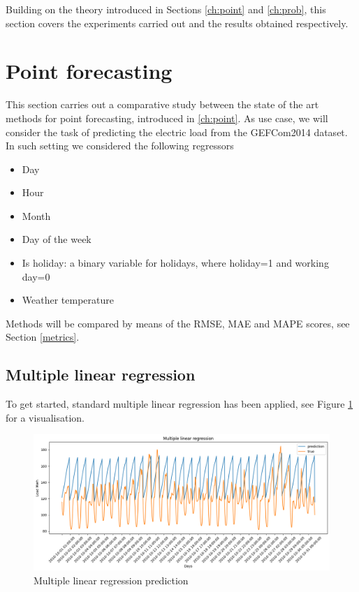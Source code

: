 Building on the theory introduced in Sections \ref{ch:point} and \ref{ch:prob}, this section covers the experiments carried out and the results obtained respectively.


\section{Point forecasting}
This section carries out a comparative study between the state of the art methods for point forecasting, introduced in \ref{ch:point}.
As use case, we will consider the task of predicting the electric load from the GEFCom2014 dataset.
In such setting we considered the following regressors
\begin{itemize}
    \item Day
    \item Hour
    \item Month
    \item Day of the week
    \item Is holiday: a binary variable for holidays, where holiday=1 and working day=0
    \item Weather temperature
\end{itemize}
Methods will be compared by means of the RMSE, MAE and MAPE scores, see Section \ref{metrics}.
\subsection{Multiple linear regression}
To get started, standard multiple linear regression has been applied, see Figure \ref{fig:mlr_price} for a visualisation. 
\begin{figure}
    \includegraphics[width=\textwidth]{images/mlr_price.png}
    \caption{Multiple linear regression prediction}
    \label{fig:mlr_price}
\end{figure}

